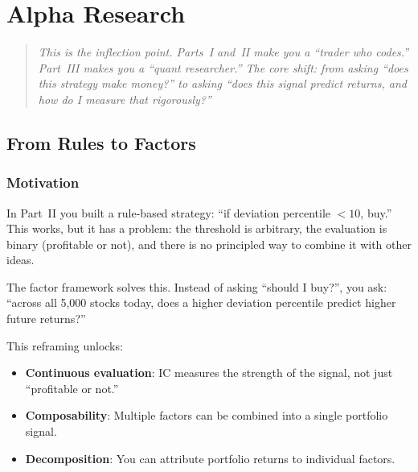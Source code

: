 \documentclass[a4paper, 11pt]{report}
\theoremstyle{definition}
\theoremstyle{remark}
\begin{document}

\part{Alpha Research}
\label{part:alpha}

\begin{quote}
\itshape
This is the inflection point.  Parts~I and~II make you a ``trader who codes.''
Part~III makes you a ``quant researcher.''  The core shift: from asking ``does
this strategy make money?'' to asking ``does this signal predict returns, and
how do I measure that rigorously?''
\end{quote}


\chapter{From Rules to Factors}
\label{ch:rules-to-factors}

\section{Motivation}

In Part~II you built a rule-based strategy: ``if deviation percentile $< 10$,
buy.''  This works, but it has a problem: the threshold is arbitrary, the
evaluation is binary (profitable or not), and there is no principled way to
combine it with other ideas.

The factor framework solves this.  Instead of asking ``should I buy?'', you ask:
``across all 5{,}000 stocks today, does a higher deviation percentile predict
higher future returns?''

This reframing unlocks:
\begin{itemize}
    \item \textbf{Continuous evaluation}: IC measures the strength of the signal,
          not just ``profitable or not.''
    \item \textbf{Composability}: Multiple factors can be combined into a single
          portfolio signal.
    \item \textbf{Decomposition}: You can attribute portfolio returns to
          individual factors.
\end{itemize}
\end{document}
